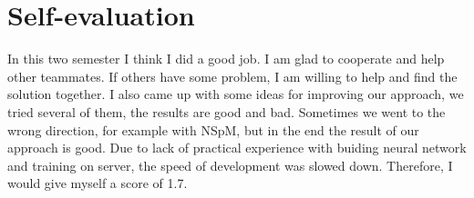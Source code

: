 
\section{Self-evaluation}

In this two semester I think I did a good job. 
I am glad to cooperate and help other teammates. 
If others have some problem, 
I am willing to help and find the solution together. 
I also came up with some ideas for improving our approach, 
we tried several of them, the results are good and bad.
Sometimes we went to the wrong direction, for example with NSpM, 
but in the end the result of our approach is good. 
Due to lack of practical experience with buiding neural network and training on server, 
the speed of development was slowed down. 
Therefore, I would give myself a score of 1.7. 
